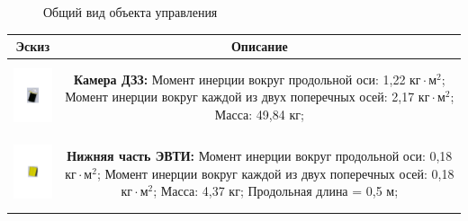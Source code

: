 \begin{figure}[h!]
    \caption{Общий вид объекта управления}
    \label{control_object_general_view}
\end{figure}

\begin{table}[h!]
    \begin{tabular}{|c|c|}
        \hline
            Эскиз & Описание                                                                                       \\
        \hline
            \includegraphics[height=20mm, keepaspectratio]{./src/pictures/sattelite_3d_images/camera}               &
            \shortstack[l]{\textbf{Камера ДЗЗ:}                                                             \\
                            Момент инерции вокруг продольной оси: 1,22 $\text{кг} \cdot \text{м}^{2}$;                    \\
                            Момент инерции вокруг каждой из двух поперечных  осей: 2,17 $\text{кг} \cdot \text{м}^{2}$;   \\
                            Масса: 49,84 кг;
                          }                                                                                         \\
        \hline
            \includegraphics[height=20mm, keepaspectratio]{./src/pictures/sattelite_3d_images/bottom_shell_part}    &
            \shortstack[l]{\textbf{Нижняя часть ЭВТИ:}                                                      \\
                            Момент инерции вокруг продольной оси: 0,18 $\text{кг} \cdot \text{м}^{2}$;                    \\
                            Момент инерции вокруг каждой из двух поперечных  осей: 0,18 $\text{кг} \cdot \text{м}^{2}$;   \\
                            Масса: 4,37 кг;                                                               \\
                            Продольная длина = 0,5 м;
}
\end{tabular}
\end{table}
